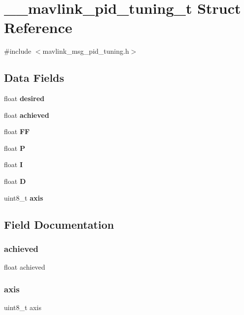 \section{\+\_\+\+\_\+mavlink\+\_\+pid\+\_\+tuning\+\_\+t Struct Reference}
\label{struct____mavlink__pid__tuning__t}


{\ttfamily \#include $<$mavlink\+\_\+msg\+\_\+pid\+\_\+tuning.\+h$>$}

\subsection*{Data Fields}
\begin{DoxyCompactItemize}
\item 
float \textbf{ desired}
\item 
float \textbf{ achieved}
\item 
float \textbf{ FF}
\item 
float \textbf{ P}
\item 
float \textbf{ I}
\item 
float \textbf{ D}
\item 
uint8\+\_\+t \textbf{ axis}
\end{DoxyCompactItemize}


\subsection{Field Documentation}
\mbox{\label{struct____mavlink__pid__tuning__t_a74d9ca98c4db9a6b1ae0c3e16d13c174}} 
\subsubsection{achieved}
{\footnotesize\ttfamily float achieved}

\mbox{\label{struct____mavlink__pid__tuning__t_aae90d1d0f77fce4ac9dc55e071f04b97}} 
\subsubsection{axis}
{\footnotesize\ttfamily uint8\+\_\+t axis}

